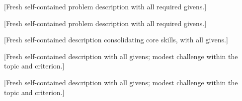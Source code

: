 [Fresh self-contained problem description with all required givens.]

[Fresh self-contained problem description with all required givens.]

[Fresh self-contained description consolidating core skills, with all givens.]

[Fresh self-contained description with all givens; modest challenge within the topic and criterion.]

[Fresh self-contained description with all givens; modest challenge within the topic and criterion.]

\par\clearpage %
\endgroup
\ifdefined\guidedresponsebox{}\fi
\ifdefined\guidedpair{}\fi

